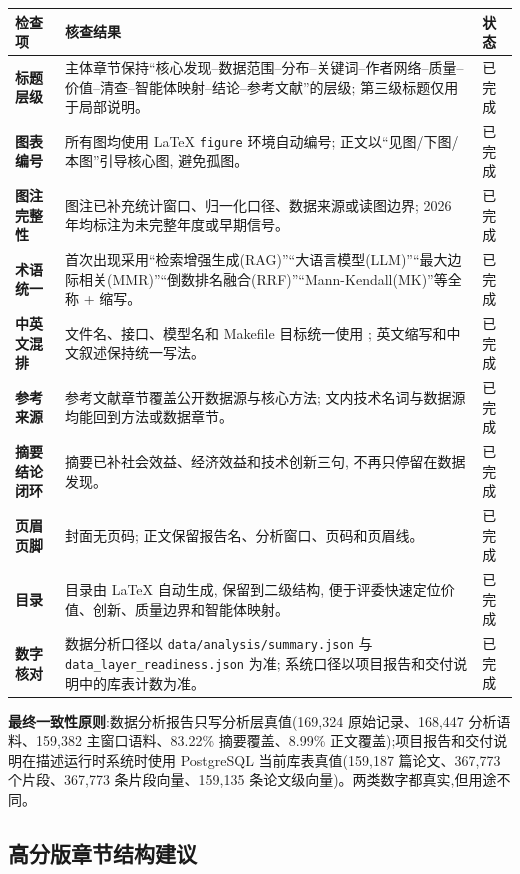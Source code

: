 \begin{center}
\begin{tabularx}{\textwidth}{>{\bfseries}p{31mm}>{\raggedright\arraybackslash}X>{\raggedright\arraybackslash}X}
\toprule
检查项 & 核查结果 & 状态 \\
\midrule
标题层级 & 主体章节保持“核心发现--数据范围--分布--关键词--作者网络--质量--价值--清查--智能体映射--结论--参考文献”的层级; 第三级标题仅用于局部说明。 & 已完成 \\
图表编号 & 所有图均使用 LaTeX \texttt{figure} 环境自动编号; 正文以“见图/下图/本图”引导核心图, 避免孤图。 & 已完成 \\
图注完整性 & 图注已补充统计窗口、归一化口径、数据来源或读图边界; 2026 年均标注为未完整年度或早期信号。 & 已完成 \\
术语统一 & 首次出现采用“检索增强生成(RAG)”“大语言模型(LLM)”“最大边际相关(MMR)”“倒数排名融合(RRF)”“Mann-Kendall(MK)”等全称 + 缩写。 & 已完成 \\
中英文混排 & 文件名、接口、模型名和 Makefile 目标统一使用 \texttt{}; 英文缩写和中文叙述保持统一写法。 & 已完成 \\
参考来源 & 参考文献章节覆盖公开数据源与核心方法; 文内技术名词与数据源均能回到方法或数据章节。 & 已完成 \\
摘要结论闭环 & 摘要已补社会效益、经济效益和技术创新三句, 不再只停留在数据发现。 & 已完成 \\
页眉页脚 & 封面无页码; 正文保留报告名、分析窗口、页码和页眉线。 & 已完成 \\
目录 & 目录由 LaTeX 自动生成, 保留到二级结构, 便于评委快速定位价值、创新、质量边界和智能体映射。 & 已完成 \\
数字核对 & 数据分析口径以 \texttt{data/analysis/summary.json} 与 \texttt{data\_layer\_readiness.json} 为准; 系统口径以项目报告和交付说明中的库表计数为准。 & 已完成 \\
\bottomrule
\end{tabularx}
\end{center}

\begin{plainbox}
\textbf{最终一致性原则}:数据分析报告只写分析层真值(169{,}324 原始记录、168{,}447 分析语料、159{,}382 主窗口语料、83.22\% 摘要覆盖、8.99\% 正文覆盖);项目报告和交付说明在描述运行时系统时使用 PostgreSQL 当前库表真值(159{,}187 篇论文、367{,}773 个片段、367{,}773 条片段向量、159{,}135 条论文级向量)。两类数字都真实,但用途不同。
\end{plainbox}

\subsection{高分版章节结构建议}

